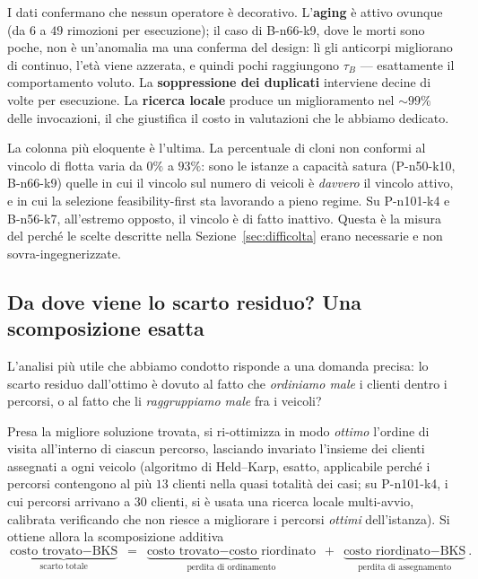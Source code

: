 \documentclass[10pt,a4paper]{article}
\begin{document}
I dati confermano che nessun operatore è decorativo. L'\textbf{aging} è attivo
ovunque (da $6$ a $49$ rimozioni per esecuzione); il caso di B-n66-k9, dove le
morti sono poche, non è un'anomalia ma una conferma del design: lì gli anticorpi
migliorano di continuo, l'età viene azzerata, e quindi pochi raggiungono $\tau_B$
--- esattamente il comportamento voluto. La \textbf{soppressione dei duplicati}
interviene decine di volte per esecuzione. La \textbf{ricerca locale} produce un
miglioramento nel $\sim\!99\%$ delle invocazioni, il che giustifica il costo in
valutazioni che le abbiamo dedicato.

La colonna più eloquente è l'ultima. La percentuale di cloni non conformi al
vincolo di flotta varia da $0\%$ a $93\%$: sono le istanze a capacità satura
(P-n50-k10, B-n66-k9) quelle in cui il vincolo sul numero di veicoli è
\emph{davvero} il vincolo attivo, e in cui la selezione feasibility-first sta
lavorando a pieno regime. Su P-n101-k4 e B-n56-k7, all'estremo opposto, il
vincolo è di fatto inattivo. Questa è la misura del perché le scelte descritte
nella Sezione~\ref{sec:difficolta} erano necessarie e non sovra-ingegnerizzate.

\subsection{Da dove viene lo scarto residuo? Una scomposizione esatta}

L'analisi più utile che abbiamo condotto risponde a una domanda precisa: lo
scarto residuo dall'ottimo è dovuto al fatto che \emph{ordiniamo male} i clienti
dentro i percorsi, o al fatto che li \emph{raggruppiamo male} fra i veicoli?

Presa la migliore soluzione trovata, si
ri-ottimizza in modo \emph{ottimo} l'ordine di visita all'interno di ciascun
percorso, lasciando invariato l'insieme dei clienti assegnati a ogni veicolo
(algoritmo di Held--Karp, esatto, applicabile perché i percorsi contengono al più
$13$ clienti nella quasi totalità dei casi; su P-n101-k4, i cui percorsi arrivano
a $30$ clienti, si è usata una ricerca locale multi-avvio, calibrata verificando
che non riesce a migliorare i percorsi \emph{ottimi} dell'istanza). Si ottiene
allora la scomposizione additiva
\[
  \underbrace{\text{costo trovato} - \text{BKS}}_{\text{scarto totale}}
  \;=\;
  \underbrace{\text{costo trovato} - \text{costo riordinato}}_{\text{perdita di ordinamento}}
  \;+\;
  \underbrace{\text{costo riordinato} - \text{BKS}}_{\text{perdita di assegnamento}} .
\]
\end{document}
